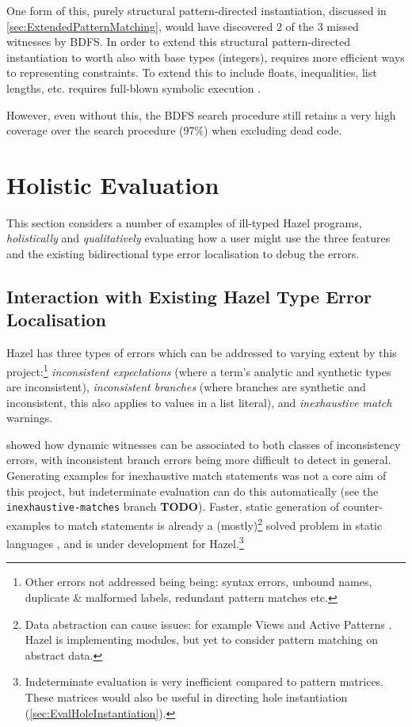 One form of this, purely structural pattern-directed instantiation, discussed in \cref{sec:ExtendedPatternMatching}, would have discovered 2 of the 3 missed witnesses by BDFS. In order to extend this structural pattern-directed instantiation to worth also with base types (integers), requires more efficient ways to representing constraints. To extend this to include floats, inequalities, list lengths, etc. requires full-blown symbolic execution \cite{SymbolicExecutionSurvey}. 

However, even without this, the BDFS search procedure still retains a very high coverage over the search procedure (97\%) when excluding dead code.

\section{Holistic Evaluation}
\label{sec:HolisticEvaluation}

This section considers a number of examples of ill-typed Hazel programs, \textit{holistically} and \textit{qualitatively} evaluating how a user might use the three features and the existing bidirectional type error localisation \cite{MarkedLocalisation} to debug the errors. 


\subsection{Interaction with Existing Hazel Type Error Localisation}
Hazel has three types of errors which can be addressed to varying extent by this project:\footnote{Other errors not addressed being being: syntax errors, unbound names, duplicate \& malformed labels, redundant pattern matches etc.} \textit{inconsistent expectations} (where a term's analytic and synthetic types are inconsistent), \textit{inconsistent branches }(where branches are synthetic and inconsistent, this also applies to values in a list literal), and \textit{inexhaustive match} warnings. 

 showed how dynamic witnesses can be associated to both classes of inconsistency errors, with inconsistent branch errors being more difficult to detect in general. Generating examples for inexhaustive match statements was not a core aim of this project, but indeterminate evaluation can do this automatically (see the \texttt{inexhaustive-matches} branch \textbf{TODO}). Faster, static generation of counter-examples to match statements is already a (mostly)\footnote{Data abstraction can cause issues: for example Views \cite{Views} and Active Patterns {\cite{ActivePatterns}}. Hazel is implementing modules, but yet to consider pattern matching on abstract data.} solved problem in static languages \cite{PatternMatchingWarnings}, and is under development for Hazel.\footnote{Indeterminate evaluation is very inefficient compared to pattern matrices. These matrices would also be useful in directing hole instantiation (\cref{sec:EvalHoleInstantiation}).}

